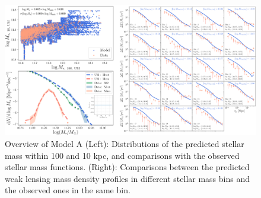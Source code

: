 \documentclass[a4paper,fleqn,usenatbib]{mnras}
\begin{document}
    \begin{figure}
        \centering 
        \includegraphics[width=\textwidth]{fig/um2_model_A}
            \caption{
                Overview of Model A 
                (Left): Distributions of the predicted stellar mass within 100 and 
                10 kpc, and comparisons with the observed stellar mass functions.  
                (Right): Comparisons between the predicted weak lensing mass density 
                profiles in different stellar mass bins and the observed ones in the 
                same bin.
                }
        \label{fig:um2_m100_m10_1}
    \end{figure}
\end{document}

